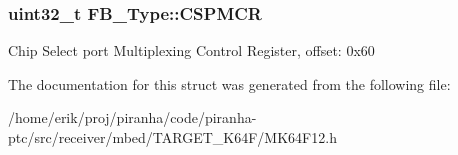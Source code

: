 \subsubsection[{\texorpdfstring{C\+S\+P\+M\+CR}{CSPMCR}}]{ uint32\+\_\+t F\+B\+\_\+\+Type\+::\+C\+S\+P\+M\+CR}\hypertarget{structFB__Type_aa557896c8a786ee5e7bebdf341369d02}{}\label{structFB__Type_aa557896c8a786ee5e7bebdf341369d02}
Chip Select port Multiplexing Control Register, offset\+: 0x60 

The documentation for this struct was generated from the following file\+:\begin{DoxyCompactItemize}
\item 
/home/erik/proj/piranha/code/piranha-\/ptc/src/receiver/mbed/\+T\+A\+R\+G\+E\+T\+\_\+\+K64\+F/M\+K64\+F12.\+h\end{DoxyCompactItemize}
